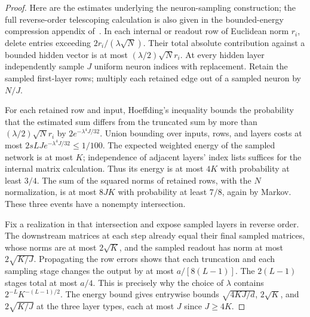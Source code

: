 \documentclass[11pt]{article}
\theoremstyle{remark}\newtheorem{remark}[theorem]{Remark}
\begin{document}
\begin{proof}
Here are the estimates underlying the neuron-sampling construction;
the full reverse-order telescoping calculation is also given in the
bounded-energy compression appendix of~\cite{nongaus}.
In each internal or readout row of Euclidean norm $r_i$, delete entries
exceeding $2r_i/(\lambda\sqrt N)$. Their total absolute contribution
against a bounded hidden vector is at most
$(\lambda/2)\sqrt N r_i$. At every hidden layer independently sample
$J$ uniform neuron indices with replacement. Retain the sampled first-layer
rows; multiply each retained edge out of a sampled neuron by $N/J$.

For each retained row and input, Hoeffding's inequality bounds the
probability that the estimated sum differs from the truncated sum by
more than $(\lambda/2)\sqrt N r_i$ by
$2e^{-\lambda^4J/32}$. Union bounding over inputs, rows, and layers
costs at most $2sLJ e^{-\lambda^4J/32}\leq1/100$.
The expected weighted energy of the sampled network is at most $K$;
independence of adjacent layers' index lists suffices for the internal
matrix calculation. Thus its energy is at most $4K$ with probability
at least $3/4$. The sum of the squared norms of retained rows, with
the $N$ normalization, is at most $8JK$ with probability at least $7/8$,
again by Markov. These three events have a nonempty intersection.

Fix a realization in that intersection and expose sampled layers in
reverse order. The downstream matrices at each step already equal their
final sampled matrices, whose norms are at most $2\sqrt K$, and the
sampled readout has norm at most $2\sqrt{K/J}$. Propagating the row
errors shows that each truncation and each sampling stage changes the
output by at most $a/[8(L-1)]$. The $2(L-1)$ stages total at most
$a/4$. This is precisely why the choice of $\lambda$ contains
$2^{-L}K^{-(L-1)/2}$. The energy bound gives entrywise bounds
$\sqrt{4KJ/d}$, $2\sqrt K$, and $2\sqrt{K/J}$ at the three layer
types, each at most $J$ since $J\geq4K$.
\end{proof}
\end{document}
